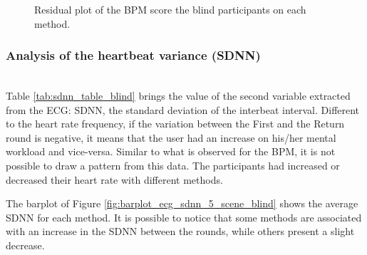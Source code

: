 \begin{figure}[!htb]
\begin{minipage}{0.45\textwidth}
        \caption{Residual plot of the BPM score the blind participants on each method.}
        \label{fig:residplot_bpm_two_way_blind}
    \end{minipage}
\end{figure}



%



%
%
\subsubsection*{Analysis of the heartbeat variance (SDNN)}\mbox{}\\
%
Table \ref{tab:sdnn_table_blind} brings the value of the second variable extracted from the ECG: SDNN, the standard deviation of the interbeat interval. Different to the heart rate frequency, if the variation between the First and the Return round is negative, it means that the user had an increase on his/her mental workload and vice-versa. Similar to what is observed for the BPM, it is not possible to draw a pattern from this data. The participants had increased or decreased their heart rate with different methods.



The barplot of Figure \ref{fig:barplot_ecg_sdnn_5_scene_blind} shows the average SDNN for each method. It is possible to notice that some methods are associated with an increase in the SDNN between the rounds, while others present a slight decrease.

